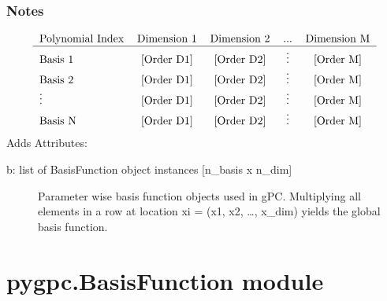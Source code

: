 \documentclass[letterpaper,10pt,english,openany,oneside]{sphinxmanual}
\begin{document}
\begin{fulllineitems}
\begin{fulllineitems}
\subsubsection*{Notes}
\begin{equation*}
\begin{split}\begin{tabular}{l*{4}{c}}
 Polynomial Index    & Dimension 1 & Dimension 2 & ... & Dimension M \\
\hline
 Basis 1             & [Order D1] & [Order D2] & \vdots & [Order M] \\
 Basis 2             & [Order D1] & [Order D2] & \vdots & [Order M] \\
\vdots              & [Order D1] & [Order D2] & \vdots  & [Order M] \\
 Basis N           & [Order D1] & [Order D2] & \vdots & [Order M] \\
\end{tabular}\end{split}
\end{equation*}
Adds Attributes:
\begin{description}
\item[{b: list of BasisFunction object instances {[}n\_basis x n\_dim{]}}] \leavevmode
Parameter wise basis function objects used in gPC.
Multiplying all elements in a row at location xi = (x1, x2, …, x\_dim) yields the global basis function.

\end{description}

\end{fulllineitems}


\end{fulllineitems}



\section{pygpc.BasisFunction module}
\label{\detokenize{pygpc:module-pygpc.BasisFunction}}\label{\detokenize{pygpc:pygpc-basisfunction-module}}
\end{document}
